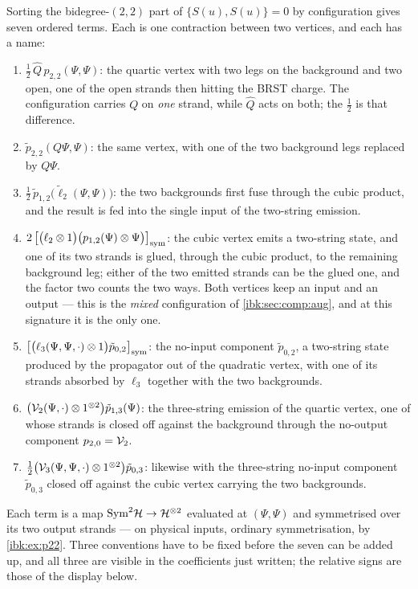 Sorting the bidegree-$(2,2)$ part of $\{S(u),S(u)\}=0$ by configuration gives seven ordered terms. Each is one contraction between two vertices, and each has a name:
\begin{enumerate}
  \setlength{\itemsep}{0.6ex}

  \item $\tfrac12\,\hat Q\,p_{2,2}(\Psi,\Psi)$: the quartic vertex with two legs on the background and two open, one of the open strands then hitting the BRST charge. The configuration carries $Q$ on \emph{one} strand, while $\hat Q$ acts on both; the $\tfrac12$ is that difference.

  \item $\tilde p_{2,2}(Q\Psi,\Psi)$: the same vertex, with one of the two background legs replaced by $Q\Psi$.

  \item $\tfrac12\,\tilde p_{1,2}\bigl(\tilde\ell_2(\Psi,\Psi)\bigr)$: the two backgrounds first fuse through the cubic product, and the result is fed into the single input of the two-string emission.

  \item $2\,\bigl[\bigl(\ell_2\otimes1\bigr)\bigl(p_{1,2}(\Psi)\otimes\Psi\bigr)\bigr]_{\rm sym}$: the cubic vertex emits a two-string state, and one of its two strands is glued, through the cubic product, to the remaining background leg; either of the two emitted strands can be the glued one, and the factor two counts the two ways. Both vertices keep an input and an output --- this is the \emph{mixed} configuration of \cref{ibk:sec:comp:aug}, and at this signature it is the only one.

  \item $\bigl[\bigl(\ell_3(\Psi,\Psi,\cdot)\otimes1\bigr)\tilde p_{0,2}\bigr]_{\rm sym}$: the no-input component $\tilde p_{0,2}$, a two-string state produced by the propagator out of the quadratic vertex, with one of its strands absorbed by $\ell_3$ together with the two backgrounds.

  \item $\bigl({\mathcal{V}}_2(\Psi,\cdot)\otimes1^{\otimes2}\bigr)\tilde p_{1,3}(\Psi)$: the three-string emission of the quartic vertex, one of whose strands is closed off against the background through the no-output component $p_{2,0}={\mathcal{V}}_2$.

  \item $\tfrac12\bigl({\mathcal{V}}_3(\Psi,\Psi,\cdot)\otimes1^{\otimes2}\bigr)\tilde p_{0,3}$: likewise with the three-string no-input component $\tilde p_{0,3}$ closed off against the cubic vertex carrying the two backgrounds.
\end{enumerate}
Each term is a map $\mathrm{Sym}^2{\mathcal{H}}\to{\mathcal{H}}^{\otimes2}$ evaluated at $(\Psi,\Psi)$ and symmetrised over its two output strands --- on physical inputs, ordinary symmetrisation, by \cref{ibk:ex:p22}. Three conventions have to be fixed before the seven can be added up, and all three are visible in the coefficients just written; the relative signs are those of the display below.

